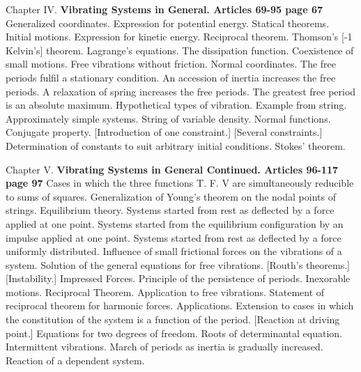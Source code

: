 Chapter IV.  \textbf{Vibrating Systems in General.  Articles 69-95 page 67}
Generalized coordinates. Expression for potential energy. Statical theorems.
Initial motions. Expression for kinetic energy. Reciprocal
theorem. Thomson’s
[-1 Kelvin's]
theorem. Lagrange’s equations. The dissipation
function. Coexistence of small motions. Free vibrations without friction.
Normal coordinates. The free periods fulfil a stationary condition. An
accession of inertia increases the free periods. A relaxation
of spring increases the free periods. The greatest free period is an
absolute maximum. Hypothetical types of vibration. Example from
string. Approximately simple systems. String of variable density.
Normal functions. Conjugate property.
[Introduction of one constraint.]
[Several constraints.]
Determination of constants to suit arbitrary initial conditions. Stokes’ theorem.


Chapter V.
\textbf{Vibrating Systems in General Continued.  Articles 96-117 page 97}
Cases in which the three functions T. F. V are simultaneously reducible to
sums of squares. Generalization of Young’s theorem on the nodal
points of strings. Equilibrium theory. Systems started from rest as
deflected by a force applied at one point. Systems started from the
equilibrium configuration by an impulse applied at one point. Systems
started from rest as deflected by a force uniformly distributed. Influence of
small frictional forces on the vibrations of a system. Solution of
the general equations for free vibrations.
[Routh’s theorems.]
[Instability.]
Impressed Forces. Principle
of the persistence of periods. Inexorable motions. Reciprocal Theorem.
Application to free vibrations. Statement of reciprocal theorem
for harmonic forces. Applications. Extension to cases in which the
constitution of the system is a function of the period.
[Reaction at driving point.]
Equations for two degrees of freedom. Roots of determinantal equation. Intermittent
vibrations. March of periods as inertia is gradually increased.
Reaction of a dependent system.


